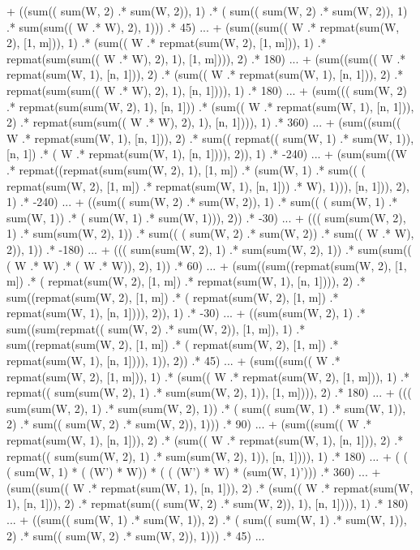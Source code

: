 \documentclass{article}
\begin{document}
  + ((sum(( sum(W, 2) .* sum(W, 2)), 1)  .* ( sum(( sum(W, 2) .* sum(W, 2)), 1) .* sum(sum(( W .* W), 2), 1)))  .* 45) ...
  + (sum((sum(( W .* repmat(sum(W, 2), [1, m])), 1)  .* (sum(( W .* repmat(sum(W, 2), [1, m])), 1)  .* repmat(sum(sum(( W .* W), 2), 1), [1, m]))), 2)  .* 180) ...
  + (sum((sum(( W .* repmat(sum(W, 1), [n, 1])), 2)  .* (sum(( W .* repmat(sum(W, 1), [n, 1])), 2)  .* repmat(sum(sum(( W .* W), 2), 1), [n, 1]))), 1)  .* 180) ...
  + (sum((( sum(W, 2) .* repmat(sum(sum(W, 2), 1), [n, 1]))  .* (sum(( W .* repmat(sum(W, 1), [n, 1])), 2)  .* repmat(sum(sum(( W .* W), 2), 1), [n, 1]))), 1)  .* 360) ...
  + (sum((sum(( W .* repmat(sum(W, 1), [n, 1])), 2)  .* sum(( repmat(( sum(W, 1) .* sum(W, 1)), [n, 1]) .* ( W .* repmat(sum(W, 1), [n, 1]))), 2)), 1)  .* -240) ...
  + (sum(sum((W  .* repmat((repmat(sum(sum(W, 2), 1), [1, m])  .* (sum(W, 1)  .* sum(( ( repmat(sum(W, 2), [1, m]) .* repmat(sum(W, 1), [n, 1])) .* W), 1))), [n, 1])), 2), 1)  .* -240) ...
  + ((sum(( sum(W, 2) .* sum(W, 2)), 1)  .* sum(( ( sum(W, 1) .* sum(W, 1)) .* ( sum(W, 1) .* sum(W, 1))), 2))  .* -30) ...
  + ((( sum(sum(W, 2), 1) .* sum(sum(W, 2), 1))  .* sum(( ( sum(W, 2) .* sum(W, 2)) .* sum(( W .* W), 2)), 1))  .* -180) ...
  + ((( sum(sum(W, 2), 1) .* sum(sum(W, 2), 1))  .* sum(sum(( ( W .* W) .* ( W .* W)), 2), 1))  .* 60) ...
  + (sum((sum((repmat(sum(W, 2), [1, m])  .* ( repmat(sum(W, 2), [1, m]) .* repmat(sum(W, 1), [n, 1]))), 2)  .* sum((repmat(sum(W, 2), [1, m])  .* ( repmat(sum(W, 2), [1, m]) .* repmat(sum(W, 1), [n, 1]))), 2)), 1)  .* -30) ...
  + ((sum(sum(W, 2), 1)  .* sum((sum(repmat(( sum(W, 2) .* sum(W, 2)), [1, m]), 1)  .* sum((repmat(sum(W, 2), [1, m])  .* ( repmat(sum(W, 2), [1, m]) .* repmat(sum(W, 1), [n, 1]))), 1)), 2))  .* 45) ...
  + (sum((sum(( W .* repmat(sum(W, 2), [1, m])), 1)  .* (sum(( W .* repmat(sum(W, 2), [1, m])), 1)  .* repmat(( sum(sum(W, 2), 1) .* sum(sum(W, 2), 1)), [1, m]))), 2)  .* 180) ...
  + ((( sum(sum(W, 2), 1) .* sum(sum(W, 2), 1))  .* ( sum(( sum(W, 1) .* sum(W, 1)), 2) .* sum(( sum(W, 2) .* sum(W, 2)), 1)))  .* 90) ...
  + (sum((sum(( W .* repmat(sum(W, 1), [n, 1])), 2)  .* (sum(( W .* repmat(sum(W, 1), [n, 1])), 2)  .* repmat(( sum(sum(W, 2), 1) .* sum(sum(W, 2), 1)), [n, 1]))), 1)  .* 180) ...
  + ( ( ( sum(W, 1) * ( (W') * W)) * ( ( (W') * W) * (sum(W, 1)'))) .* 360) ...
  + (sum((sum(( W .* repmat(sum(W, 1), [n, 1])), 2)  .* (sum(( W .* repmat(sum(W, 1), [n, 1])), 2)  .* repmat(sum(( sum(W, 2) .* sum(W, 2)), 1), [n, 1]))), 1)  .* 180) ...
  + ((sum(( sum(W, 1) .* sum(W, 1)), 2)  .* ( sum(( sum(W, 1) .* sum(W, 1)), 2) .* sum(( sum(W, 2) .* sum(W, 2)), 1)))  .* 45) ...
\end{document}

